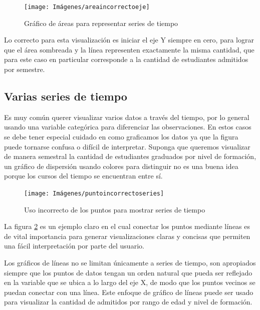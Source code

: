 \documentclass[
]{book}
\begin{document}
\begin{figure}

{\centering \texttt{[image: Imágenes/areaincorrectoeje]} 

}

\caption{Gráfico de áreas para representar series de tiempo}\label{fig:areasincorrecto-fig}
\end{figure}

Lo correcto para esta visualización es iniciar el eje Y siempre en cero, para lograr que el área sombreada y la línea representen exactamente la misma cantidad, que para este caso en particular corresponde a la cantidad de estudiantes admitidos por semestre.

\hypertarget{varias-series-de-tiempo}{%
\subsection{Varias series de tiempo}\label{varias-series-de-tiempo}}

Es muy común querer visualizar varios datos a través del tiempo, por lo general usando una variable categórica para diferenciar las observaciones. En estos casos se debe tener especial cuidado en como graficamos los datos ya que la figura puede tornarse confusa o difícil de interpretar. Suponga que queremos visualizar de manera semestral la cantidad de estudiantes graduados por nivel de formación, un gráfico de dispersión usando colores para distinguir no es una buena idea porque los cursos del tiempo se encuentran entre sí.

\begin{figure}

{\centering \texttt{[image: Imágenes/puntoincorrectoseries]} 

}

\caption{Uso incorrecto de los puntos para mostrar series de tiempo}\label{fig:puntoincorrectoseries-fig}
\end{figure}

La figura \ref{fig:puntoincorrectoseries-fig} es un ejemplo claro en el cual conectar los puntos mediante líneas es de vital importancia para generar visualizaciones claras y concisas que permiten una fácil interpretación por parte del usuario.

Los gráficos de líneas no se limitan únicamente a series de tiempo, son apropiados siempre que los puntos de datos tengan un orden natural que pueda ser reflejado en la variable que se ubica a lo largo del eje X, de modo que los puntos vecinos se puedan conectar con una línea. Este enfoque de gráfico de líneas puede ser usado para visualizar la cantidad de admitidos por rango de edad y nivel de formación.
\end{document}
